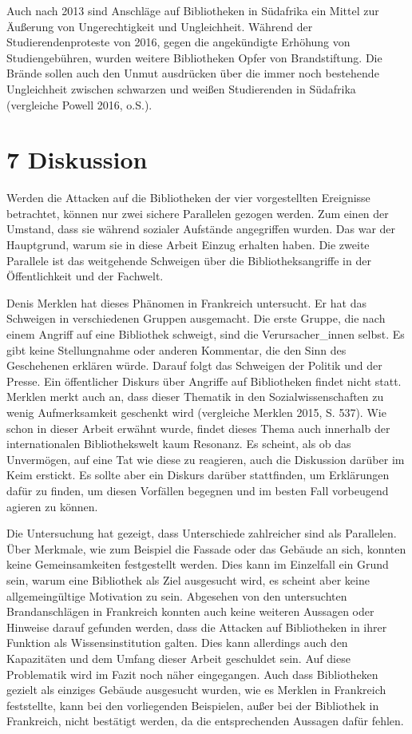 \documentclass[a4paper,
fontsize=11pt,
oneside,
numbers=noperiodatend,
parskip=half-,
bibliography=totoc,
final
]{scrartcl}
\begin{document}
Auch nach 2013 sind Anschläge auf Bibliotheken in Südafrika ein Mittel
zur Äußerung von Ungerechtigkeit und Ungleichheit. Während der
Studierendenproteste von 2016, gegen die angekündigte Erhöhung von
Studiengebühren, wurden weitere Bibliotheken Opfer von Brandstiftung.
Die Brände sollen auch den Unmut ausdrücken über die immer noch
bestehende Ungleichheit zwischen schwarzen und weißen Studierenden in
Südafrika (vergleiche Powell 2016, o.S.).

\hypertarget{diskussion}{%
\section{7 Diskussion}\label{diskussion}}

Werden die Attacken auf die Bibliotheken der vier vorgestellten
Ereignisse betrachtet, können nur zwei sichere Parallelen gezogen
werden. Zum einen der Umstand, dass sie während sozialer Aufstände
angegriffen wurden. Das war der Hauptgrund, warum sie in diese Arbeit
Einzug erhalten haben. Die zweite Parallele ist das weitgehende
Schweigen über die Bibliotheksangriffe in der Öffentlichkeit und der
Fachwelt.

Denis Merklen hat dieses Phänomen in Frankreich untersucht. Er hat das
Schweigen in verschiedenen Gruppen ausgemacht. Die erste Gruppe, die
nach einem Angriff auf eine Bibliothek schweigt, sind die
Verursacher\_innen selbst. Es gibt keine Stellungnahme oder anderen
Kommentar, die den Sinn des Geschehenen erklären würde. Darauf folgt das
Schweigen der Politik und der Presse. Ein öffentlicher Diskurs über
Angriffe auf Bibliotheken findet nicht statt. Merklen merkt auch an,
dass dieser Thematik in den Sozialwissenschaften zu wenig Aufmerksamkeit
geschenkt wird (vergleiche Merklen 2015, S. 537). Wie schon in dieser
Arbeit erwähnt wurde, findet dieses Thema auch innerhalb der
internationalen Bibliothekswelt kaum Resonanz. Es scheint, als ob das
Unvermögen, auf eine Tat wie diese zu reagieren, auch die Diskussion
darüber im Keim erstickt. Es sollte aber ein Diskurs darüber
stattfinden, um Erklärungen dafür zu finden, um diesen Vorfällen
begegnen und im besten Fall vorbeugend agieren zu können.

Die Untersuchung hat gezeigt, dass Unterschiede zahlreicher sind als
Parallelen. Über Merkmale, wie zum Beispiel die Fassade oder das Gebäude
an sich, konnten keine Gemeinsamkeiten festgestellt werden. Dies kann im
Einzelfall ein Grund sein, warum eine Bibliothek als Ziel ausgesucht
wird, es scheint aber keine allgemeingültige Motivation zu sein.
Abgesehen von den untersuchten Brandanschlägen in Frankreich konnten
auch keine weiteren Aussagen oder Hinweise darauf gefunden werden, dass
die Attacken auf Bibliotheken in ihrer Funktion als Wissensinstitution
galten. Dies kann allerdings auch den Kapazitäten und dem Umfang dieser
Arbeit geschuldet sein. Auf diese Problematik wird im Fazit noch näher
eingegangen. Auch dass Bibliotheken gezielt als einziges Gebäude
ausgesucht wurden, wie es Merklen in Frankreich feststellte, kann bei
den vorliegenden Beispielen, außer bei der Bibliothek in Frankreich,
nicht bestätigt werden, da die entsprechenden Aussagen dafür fehlen.
\end{document}

